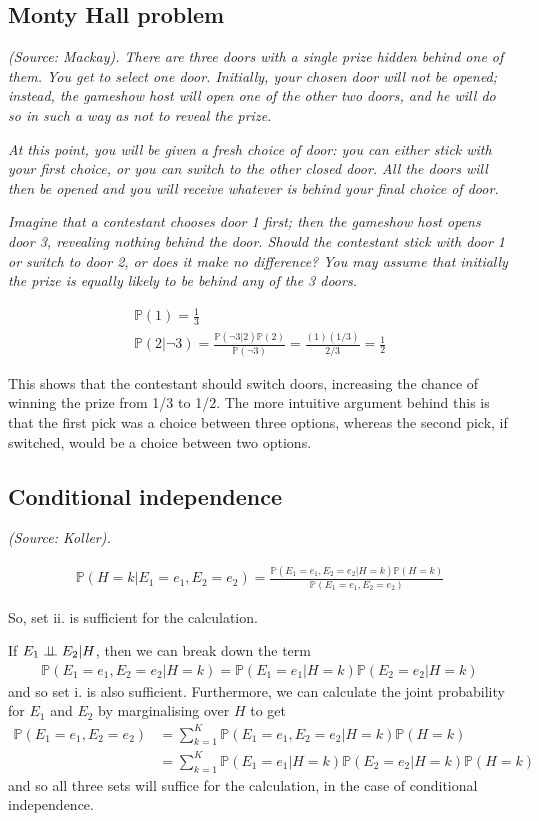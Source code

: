 \subsection{Monty Hall problem}
\textit{(Source: Mackay). There are three doors with a single prize hidden behind one of them. You get to select one door. Initially, your chosen door will not be opened; instead, the gameshow host will open one of the other two doors, and he will do so in such a way as not to reveal the prize.}

\textit{At this point, you will be given a fresh choice of door: you can either stick with your first choice, or you can switch to the other closed door. All the doors will then be opened and you will receive whatever is behind your final choice of door.}

\textit{Imagine that a contestant chooses door 1 first; then the gameshow host opens door 3, revealing nothing behind the door. Should the contestant stick with door 1 or switch to door 2, or does it make no difference? You may assume that initially the prize is equally likely to be behind any of the 3 doors.}

\begin{gather*}
\mathbb{P}(1) = \frac{1}{3}\\
\mathbb{P}(2|\neg 3) = \frac{\mathbb{P}(\neg 3|2)\mathbb{P}(2)}{\mathbb{P}(\neg 3)} = \frac{(1)(1/3)}{2/3} = \frac{1}{2}
\end{gather*}

This shows that the contestant should switch doors, increasing the chance of winning the prize from 1/3 to 1/2. The more intuitive argument behind this is that the first pick was a choice between three options, whereas the second pick, if switched, would be a choice between two options.

\subsection{Conditional independence}
\textit{(Source: Koller).}

\begin{gather*}
\mathbb{P}(H=k|E_1=e_1,E_2=e_2) = \frac{\mathbb{P}(E_1=e_1,E_2=e_2|H=k)\mathbb{P}(H=k)}{\mathbb{P}(E_1=e_1,E_2=e_2)}
\end{gather*}

So, set ii. is sufficient for the calculation.

If $E_1 \perp\!\!\!\perp E_2|H$, then we can break down the term
\begin{gather*}
\mathbb{P}(E_1=e_1,E_2=e_2|H=k) = \mathbb{P}(E_1=e_1|H=k)\mathbb{P}(E_2=e_2|H=k)
\end{gather*}
and so set i. is also sufficient. Furthermore, we can calculate the joint probability for $E_1$ and $E_2$ by marginalising over $H$ to get
\begin{align*}
\mathbb{P}(E_1=e_1,E_2=e_2) &= \sum_{k=1}^{K} \mathbb{P}(E_1=e_1,E_2=e_2|H=k)\mathbb{P}(H=k)\\
&= \sum_{k=1}^{K} \mathbb{P}(E_1=e_1|H=k)\mathbb{P}(E_2=e_2|H=k)\mathbb{P}(H=k)
\end{align*}
and so all three sets will suffice for the calculation, in the case of conditional independence.

